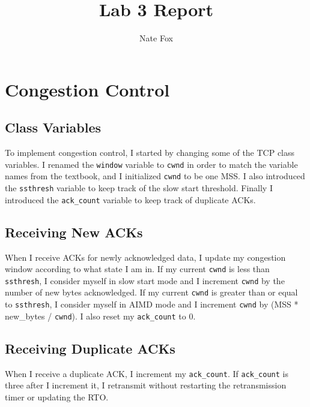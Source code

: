 \documentclass[11pt]{article}
\newcommand{\code}[1]{\texttt{#1}}
\begin{document}
\lstset{
  language=Python,
  basicstyle=\small,          %
  keywordstyle=\bfseries,
  identifierstyle=,           %
  commentstyle=,              %
  stringstyle=\ttfamily,      %
  showstringspaces=false,     %
  numbers=left,
  numberstyle=\tiny,
  numbersep=5pt,
  frame=tb,
}

\title{Lab 3 Report}

\author{Nate Fox}

\date{}

\maketitle

\section{Congestion Control}

\subsection{Class Variables}
To implement congestion control, I started by changing some of the TCP class variables. I renamed the \code{window} variable to \code{cwnd} in order to match the variable names from the textbook, and I initialized \code{cwnd} to be one MSS. I also introduced the \code{ssthresh} variable to keep track of the slow start threshold. Finally I introduced the \code{ack\_count} variable to keep track of duplicate ACKs.

\subsection{Receiving New ACKs}
When I receive ACKs for newly acknowledged data, I update my congestion window according to what state I am in. If my current \code{cwnd} is less than \code{ssthresh}, I consider myself in slow start mode and I increment \code{cwnd} by the number of new bytes acknowledged. If my current \code{cwnd} is greater than or equal to \code{ssthresh}, I consider myself in AIMD mode and I increment \code{cwnd} by (MSS * new\_bytes / \code{cwnd}). I also reset my \code{ack\_count} to 0.
 
\subsection{Receiving Duplicate ACKs}
When I receive a duplicate ACK, I increment my \code{ack\_count}. If \code{ack\_count} is three after I increment it, I retransmit without restarting the retransmission timer or updating the RTO.
\end{document}
